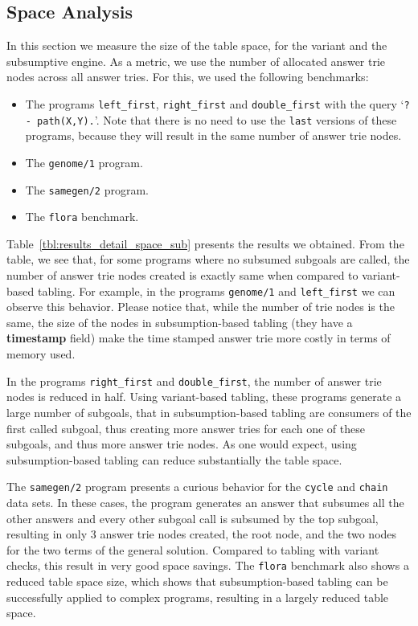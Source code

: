 \subsection{Space Analysis}

In this section we measure the size of the table space, for the variant and the subsumptive engine.
As a metric, we use the number of allocated answer trie nodes across all answer tries.
For this, we used the following benchmarks:

\begin{itemize}
   \item The programs \texttt{left\_first}, \texttt{right\_first} and \texttt{double\_first} with the query `\texttt{?-~path(X,Y).}'. Note that there is no need to use
   the \texttt{last} versions of these programs, because they will result in the same number of answer trie nodes.
   
   \item The \texttt{genome/1} program.
   
   \item The \texttt{samegen/2} program.
   
   \item The \texttt{flora} benchmark.
\end{itemize}

Table~\ref{tbl:results_detail_space_sub} presents the results we obtained. From the table, we see that,
for some programs where no subsumed subgoals are called, the number of answer trie nodes created is
exactly same when compared to variant-based tabling. For example, in the programs \texttt{genome/1} and
\texttt{left\_first} we can observe this behavior. Please notice that, while the number of trie nodes is
the same, the size of the nodes in subsumption-based tabling (they have a \textbf{timestamp} field) make
the time stamped answer trie more costly in terms of memory used.

In the programs \texttt{right\_first} and \texttt{double\_first}, the number of answer trie nodes
is reduced in half. Using variant-based tabling, these programs generate a large number of subgoals,
that in subsumption-based tabling are consumers of the first called subgoal, thus creating more
answer tries for each one of these subgoals, and thus more answer trie nodes. As one would expect,
using subsumption-based tabling can reduce substantially the table space.

The \texttt{samegen/2} program presents a curious behavior for the \texttt{cycle} and \texttt{chain}
data sets. In these cases, the program generates an answer that subsumes all the other answers and
every other subgoal call is subsumed by the top subgoal, resulting in only 3 answer trie nodes created,
the root node, and the two nodes for the two terms of the general solution. Compared to tabling with
variant checks, this result in very good space savings.
The \texttt{flora} benchmark also shows a reduced table space size, which shows that subsumption-based
tabling can be successfully applied to complex programs, resulting in a largely reduced
table space.

